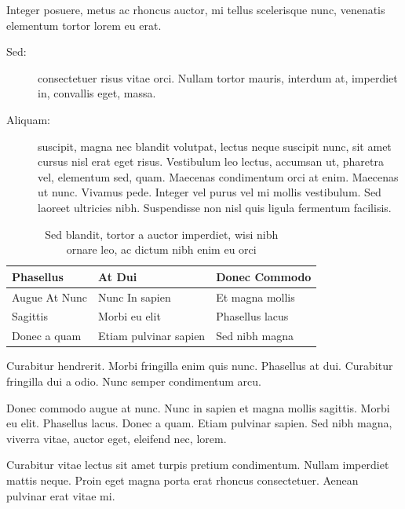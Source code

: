 \documentclass[cfonts]{nostarch}
\begin{document}
Integer posuere, metus ac rhoncus auctor, mi tellus scelerisque nunc,
venenatis elementum tortor lorem eu erat.  
\begin{description}
\item[Sed:] consectetuer risus
vitae orci. Nullam tortor mauris, interdum at, imperdiet in, convallis
eget, massa. 
\item[Aliquam:] suscipit, magna nec blandit volutpat, lectus
neque suscipit nunc, sit amet cursus nisl erat eget risus. Vestibulum
leo lectus, accumsan ut, pharetra vel, elementum sed, quam. Maecenas
condimentum orci at enim. Maecenas ut nunc. Vivamus pede. Integer vel
purus vel mi mollis vestibulum. Sed laoreet ultricies nibh.
Suspendisse non nisl quis ligula fermentum facilisis. 
\end{description}
\lipsum[37]


\begin{table}[tp]
  \caption[Sed blandit, tortor a auctor]{Sed blandit, tortor a auctor
    imperdiet, wisi nibh\\ ornare leo, 
    ac dictum nibh enim eu orci}
  \tbfont
  \begin{tabular}{lll}
    \toprule\let\normalfont=\bfseries%
    \thfont Phasellus &  \thfont At Dui       & \thfont Donec Commodo \\
    \midrule    
     Augue At Nunc    & Nunc In  sapien       & Et magna mollis \\
     Sagittis         &  Morbi eu elit        &  Phasellus lacus\\
     Donec a quam     & Etiam pulvinar sapien & Sed nibh magna\\
    \bottomrule
  \end{tabular}
\label{tab:one}
\end{table}

\lipsum[60]

Curabitur hendrerit. Morbi fringilla enim
  quis nunc. Phasellus at dui. Curabitur fringilla dui a odio.
  Nunc semper condimentum arcu. 
\begin{note}
  Donec commodo augue at nunc. Nunc in sapien et magna mollis
  sagittis. Morbi eu elit. Phasellus lacus.  Donec a quam. Etiam
  pulvinar sapien. Sed nibh magna, viverra vitae, auctor eget,
  eleifend nec, lorem.
\end{note}
Curabitur vitae lectus sit amet turpis pretium condimentum. Nullam
imperdiet mattis neque. Proin eget magna porta erat rhoncus
consectetuer. Aenean pulvinar erat vitae mi.
\end{document}
